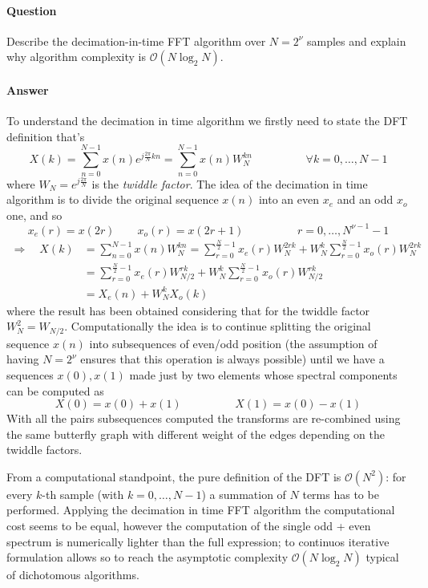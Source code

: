 \newquestion
	\paragraph{Question} Describe the decimation-in-time FFT algorithm over $N = 2^\nu$
	samples and explain why algorithm complexity is $\mathcal O(N \log_2 N)$.

	
	\paragraph{Answer} To understand the decimation in time algorithm we firstly need to state the DFT definition that's
	\[ X(k) = \sum_{n=0}^{N-1} x(n) e^{j\frac{2\pi}{N}kn} = \sum_{n=0}^{N-1} x(n) W_N^{kn} \hspace{2cm} \forall k=0,\dots,N-1 \]
	where $W_N = e^{j\frac{2\pi}{N}}$ is the \textit{twiddle factor}. The idea of the decimation in time algorithm is to divide the original sequence $x(n)$ into an even $x_e$ and an odd $x_o$ one, and so
	\[ x_e(r) = x(2r) \qquad x_o(r) = x(2r+1) \hspace{2cm} r =0,\dots, N^{\nu - 1} - 1 \]
	\begin{align*}
		\Rightarrow \quad X(k) & = \sum_{n=0}^{N-1} x(n) W_N^{kn} = \sum_{r=0}^{\frac N2-1} x_e(r) W_{N}^{2rk} + W_N^{k} \sum_{r=0}^{\frac N2-1} x_o(r) W_{N}^{2rk}		
		\\ & = \sum_{r=0}^{\frac N2-1} x_e(r) W_{N/2}^{rk} + W_N^{k} \sum_{r=0}^{\frac N2-1} x_o(r) W_{N/2}^{rk} \\		
		& = X_e(n) + W_N^kX_o(k)
	\end{align*}
	where the result has been obtained considering that for the twiddle factor $W_{N}^2 = W_{N/2}$. Computationally the idea is to continue splitting the original sequence $x(n)$ into subsequences of even/odd position (the assumption of having $N=2^\nu$ ensures that this operation is always possible) until we have a sequences $x(0),x(1)$ made just by two elements whose spectral components can be computed as
	\[ X(0) = x(0)+x(1) \hspace{2cm} X(1) = x(0) - x(1) \]
	With all the pairs subsequences computed the transforms are re-combined using the same butterfly graph with different weight of the edges depending on the twiddle factors.
	
	From a computational standpoint, the pure definition of the DFT is $\mathcal O (N^2)$: for every $k$-th sample (with $k=0,\dots,N-1$) a summation of $N$ terms has to be performed. Applying the decimation in time FFT algorithm the computational cost seems to be equal, however the computation of the single odd + even spectrum is numerically lighter than the full expression; to continuos iterative formulation allows so to reach the asymptotic complexity $\mathcal O(N\log_2N)$ typical of dichotomous algorithms.

